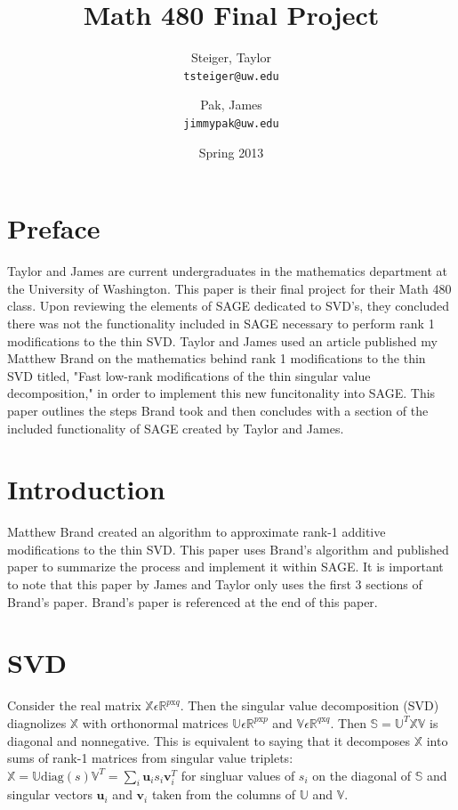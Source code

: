 \documentclass{article}
\begin{document}
\title{Math 480 Final Project}
\author{
  Steiger, Taylor\\
  \texttt{tsteiger@uw.edu}
  \and
  Pak, James\\
  \texttt{jimmypak@uw.edu}
}
\date{Spring 2013}
\maketitle

\newpage
\tableofcontents
\newpage

\section{Preface\label{intro}}
Taylor and James are current undergraduates in the mathematics department at the University of Washington. This paper is their final project for their Math 480 class. Upon reviewing the elements of SAGE dedicated to SVD's, they concluded there was not the functionality included in SAGE necessary to perform rank 1 modifications to the thin SVD. Taylor and James used an article published my Matthew Brand on the mathematics behind rank 1 modifications to the thin SVD titled, "Fast low-rank modiﬁcations of the thin singular value decomposition," in order to implement this new funcitonality into SAGE. This paper outlines the steps Brand took and then concludes with a section of the included functionality of SAGE created by Taylor and James.

\section{Introduction\label{intro}}
Matthew Brand created an algorithm to approximate rank-1 additive modifications to the thin SVD. This paper uses Brand's algorithm and published paper to summarize the process and implement it within SAGE. It is important to note that this paper by James and Taylor only uses the first 3 sections of Brand's paper. Brand's paper is referenced at the end of this paper.


\section{SVD\label{svd}}
Consider the real matrix $\mathds{X}{\epsilon}{\mathds{R}^{p\mathrm{x}q}}$.
Then the singular value decomposition (SVD) diagnolizes $\mathds{X}$ with orthonormal matrices $\mathds{U}\epsilon \mathds{R}^{p\mathrm{x}p}$ and $\mathds{V} \epsilon \mathds{R}\label{R}^{q\mathrm{x}q}$.
Then $\mathds{S}=\mathds{U}^T\mathds{X}\mathds{V}$ is diagonal and nonnegative. This is equivalent to saying that it decomposes $\mathds{X}$ into sums of rank-1 matrices from singular value triplets: $\mathds{X} = \mathds{U}\mathrm{diag}{(s)}\mathds{V}^T = \sum_{i} \mathbf{u}_{i} s_{i} \mathbf{v}_{i}^T$ for singluar values of $s_{i}$ on the diagonal of $\mathds{S}$ and singular vectors $\mathbf{u}_{i}$ and $\mathbf{v}_{i}$ taken from the columns of $\mathds{U}$ and $\mathds{V}$.
\end{document}
